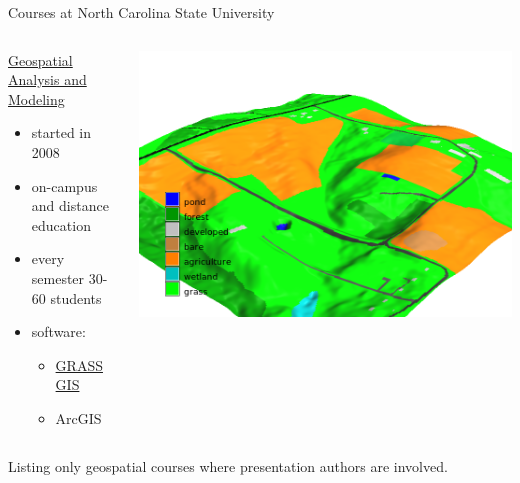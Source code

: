 \documentclass[xcolor={dvipsnames,usenames},beamer]{beamer}
\begin{document}
\newcommand{\coursesTitle}{Courses at North Carolina State University}

\begin{frame}{\coursesTitle}

\begin{columns}[c]


\begin{block}{\href{http://courses.ncsu.edu/gis582/common/}%
  {Geospatial Analysis and Modeling}}
\begin{itemize}
 \item started in 2008
 \item on-campus and distance education
 \item every semester 30-60 students
 \item software:
 \begin{itemize}
   \item \href{http://grass.osgeo.org}{GRASS GIS}
   \item ArcGIS
 \end{itemize}
\end{itemize}
\end{block}


\includegraphics[width=\textwidth]{./images/edu/secref}%

\end{columns}

\bigskip

Listing only geospatial courses where presentation authors are involved.

\end{frame}
\end{document}
